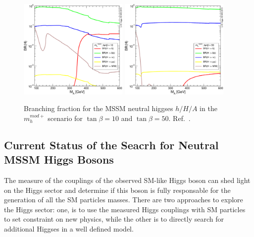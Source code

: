 \begin{figure}[tp]
\begin{center}
            \includegraphics[width=0.47\textwidth]{figure/BR_higgs/YRHXS3_BR_fig37.pdf}
            \includegraphics[width=0.47\textwidth]{figure/BR_higgs/YRHXS3_BR_fig38.pdf}

    \end{center}
    \caption{Branching fraction for the MSSM neutral higgses $h/H/A$ in the $m_h^{mod+}$ scenario for $\tan\beta=10$ and
	$\tan\beta=50$. Ref.~\cite{LHCxsec}.}
   \label{fig:br}

\end{figure}



\subsection{Current Status of the Seacrh for Neutral MSSM Higgs Bosons}

The measure of the couplings of the observed SM-like Higgs boson can shed light on the Higgs sector and determine if this boson
is fully responsable for the generation of all the SM particles masses. 
There are two approaches to explore the Higgs sector: one, is to use the measured Higgs couplings with SM particles to 
set constraint on new physics, while the other is to directly search for additional Higgses in a well defined model.

